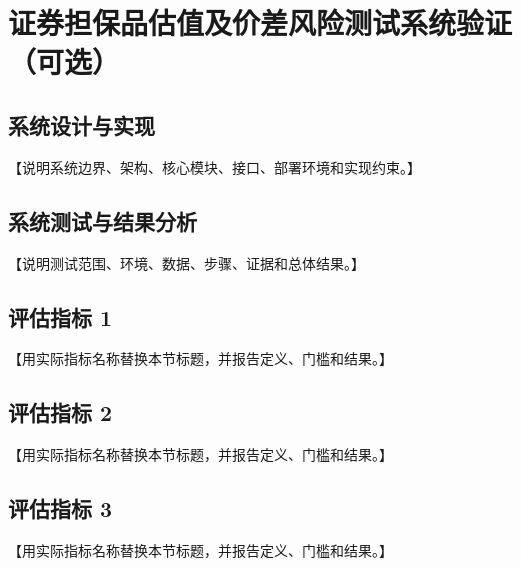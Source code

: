 \chapter{证券担保品估值及价差风险测试系统验证（可选）}

\section{系统设计与实现}

【说明系统边界、架构、核心模块、接口、部署环境和实现约束。】

\section{系统测试与结果分析}

【说明测试范围、环境、数据、步骤、证据和总体结果。】

\section{评估指标 1}

【用实际指标名称替换本节标题，并报告定义、门槛和结果。】

\section{评估指标 2}

【用实际指标名称替换本节标题，并报告定义、门槛和结果。】

\section{评估指标 3}

【用实际指标名称替换本节标题，并报告定义、门槛和结果。】
